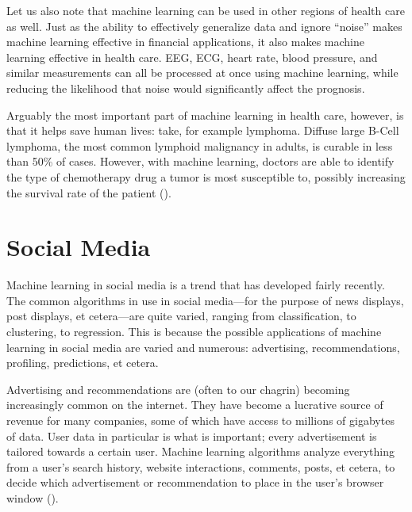 \documentclass{comjnl}
\numberwithin{equation}{subsection}
\begin{document}
        Let us also note that machine learning can be used in other regions of health care as well.
        Just as the ability to effectively generalize data and ignore ``noise'' makes machine
        learning effective in financial applications, it also makes machine learning effective in
        health care. EEG, ECG, heart rate, blood pressure, and similar measurements can all be
        processed at once using machine learning, while reducing the likelihood that noise would
        significantly affect the prognosis.

        Arguably the most important part of machine learning in health care, however, is that it
        helps save human lives: take, for example lymphoma. Diffuse large B-Cell lymphoma, the most
        common lymphoid malignancy in adults, is curable in less than 50\% of cases. However, with
        machine learning, doctors are able to identify the type of chemotherapy drug a tumor is most
        susceptible to, possibly increasing the survival rate of the patient (\cite{shippm}).        


    \section{Social Media}

        Machine learning in social media is a trend that has developed fairly recently. The common
        algorithms in use in social media---for the purpose of news displays, post displays, et
        cetera---are quite varied, ranging from classification, to clustering, to regression.
        This is because the possible applications of machine learning in social media are varied
        and numerous: advertising, recommendations, profiling, predictions, et cetera. 

        Advertising and recommendations are (often to our chagrin) becoming increasingly common on
        the internet. They have become a lucrative source of revenue for many companies, some of
        which have access to millions of gigabytes of data. User data in particular is what is
        important; every advertisement is tailored towards a certain user. Machine learning
        algorithms analyze everything from a user's search history, website interactions, comments,
        posts, et cetera, to decide which advertisement or recommendation to place in the user's
        browser window (\cite{perlichc}).
\end{document}
